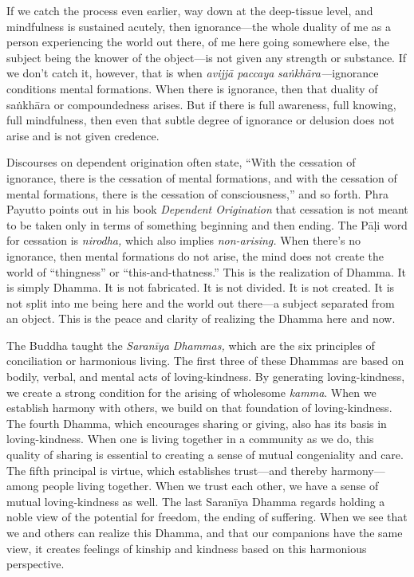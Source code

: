 If we catch the process even earlier, way down at the deep-tissue 
level, and mindfulness is sustained acutely, then ignorance---the whole 
duality of me as a person experiencing the world out there, of me here 
going somewhere else, the subject being the knower of the object---is 
not given any strength or substance. If we don't catch it, however, 
that is when \emph{avijjā paccaya} \emph{saṅkhāra---}ignorance 
conditions mental formations. When there is ignorance, then that 
duality of saṅkhāra or compoundedness arises. But if there is full 
awareness, full knowing, full mindfulness, then even that subtle degree 
of ignorance or delusion does not arise and is not given credence.

Discourses on dependent origination often state, ``With the cessation 
of ignorance, there is the cessation of mental formations, and with the 
cessation of mental formations, there is the cessation of 
consciousness,'' and so forth. Phra Payutto points out in his book 
\emph{Dependent Origination} that cessation is not meant to be taken 
only in terms of something beginning and then ending. The Pāḷi word 
for cessation is \emph{nirodha,} which also implies \emph{non-arising.} 
When there's no ignorance, then mental formations do not arise, the 
mind does not create the world of ``thingness'' or 
``this-and-thatness.'' This is the realization of Dhamma. It is simply 
Dhamma. It is not fabricated. It is not divided. It is not created. It 
is not split into me being here and the world out there---a subject 
separated from an object. This is the peace and clarity of realizing 
the Dhamma here and now.


The Buddha taught the \emph{Saranīya Dhammas,} which are the six 
principles of conciliation or harmonious living. The first three of 
these Dhammas are based on bodily, verbal, and mental acts of 
loving-kindness. By generating loving-kindness, we create a strong 
condition for the arising of wholesome \emph{kamma}. When we establish 
harmony with others, we build on that foundation of loving-kindness. 
The fourth Dhamma, which encourages sharing or giving, also has its 
basis in loving-kindness. When one is living together in a community as 
we do, this quality of sharing is essential to creating a sense of 
mutual congeniality and care. The fifth principal is virtue, which 
establishes trust---and thereby harmony---among people living together. 
When we trust each other, we have a sense of mutual loving-kindness as 
well. The last Saranīya Dhamma regards holding a noble view of the 
potential for freedom, the ending of suffering. When we see that we and 
others can realize this Dhamma, and that our companions have the same 
view, it creates feelings of kinship and kindness based on this 
harmonious perspective.

